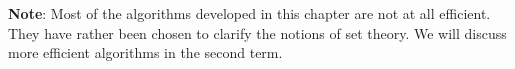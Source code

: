 \noindent
\textbf{Note}:
Most of the algorithms developed in this chapter are not at all efficient.
They have rather been chosen to clarify the notions of set theory.  
We will discuss more efficient algorithms in the second term.

